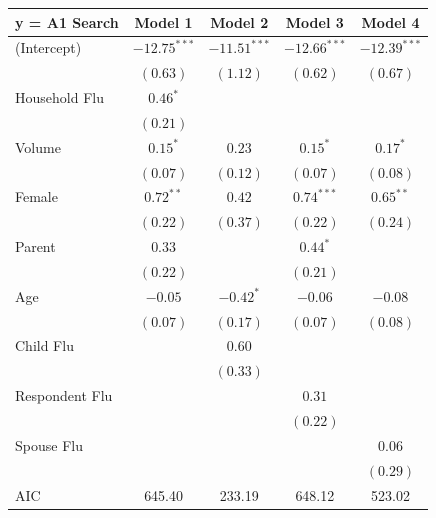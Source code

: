 \documentclass[12pt]{article}
\begin{document}
\begin{table}
\begin{center}
\begin{tabular}{l c c c c }
\hline
y = A1 Search & Model 1 & Model 2 & Model 3 & Model 4 \\
\hline
(Intercept)    & $-12.75^{***}$ & $-11.51^{***}$ & $-12.66^{***}$ & $-12.39^{***}$ \\
               & $(0.63)$       & $(1.12)$       & $(0.62)$       & $(0.67)$       \\
Household Flu  & $0.46^{*}$     &                &                &                \\
               & $(0.21)$       &                &                &                \\
Volume         & $0.15^{*}$     & $0.23$         & $0.15^{*}$     & $0.17^{*}$     \\
               & $(0.07)$       & $(0.12)$       & $(0.07)$       & $(0.08)$       \\
Female         & $0.72^{**}$    & $0.42$         & $0.74^{***}$   & $0.65^{**}$    \\
               & $(0.22)$       & $(0.37)$       & $(0.22)$       & $(0.24)$       \\
Parent         & $0.33$         &                & $0.44^{*}$     &                \\
               & $(0.22)$       &                & $(0.21)$       &                \\
Age            & $-0.05$        & $-0.42^{*}$    & $-0.06$        & $-0.08$        \\
               & $(0.07)$       & $(0.17)$       & $(0.07)$       & $(0.08)$       \\
Child Flu         &                & $0.60$         &                &                \\
               &                & $(0.33)$       &                &                \\
Respondent Flu          &                &                & $0.31$         &                \\
               &                &                & $(0.22)$       &                \\
Spouse Flu          &                &                &                & $0.06$         \\
               &                &                &                & $(0.29)$       \\
\hline
AIC            & 645.40         & 233.19         & 648.12         & 523.02         \\

\end{tabular}
\end{center}
\end{table}
\end{document}
